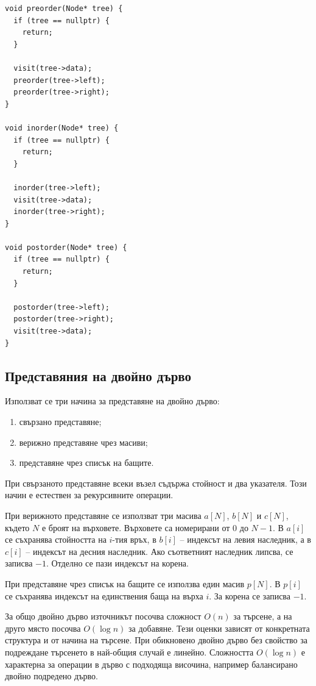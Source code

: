 \begin{verbatim}
void preorder(Node* tree) {
  if (tree == nullptr) {
    return;
  }

  visit(tree->data);
  preorder(tree->left);
  preorder(tree->right);
}

void inorder(Node* tree) {
  if (tree == nullptr) {
    return;
  }

  inorder(tree->left);
  visit(tree->data);
  inorder(tree->right);
}

void postorder(Node* tree) {
  if (tree == nullptr) {
    return;
  }

  postorder(tree->left);
  postorder(tree->right);
  visit(tree->data);
}
\end{verbatim}

\subsection{Представяния на двойно дърво}\label{s:18.6.3}

Използват се три начина за представяне на двойно дърво:

\begin{enumerate}
    \item свързано представяне;
    \item верижно представяне чрез масиви;
    \item представяне чрез списък на бащите.
\end{enumerate}

При свързаното представяне всеки възел съдържа стойност и два указателя. Този начин е естествен за рекурсивните операции.

При верижното представяне се използват три масива $a[N]$, $b[N]$ и $c[N]$, където $N$ е броят на върховете. Върховете са номерирани от $0$ до $N-1$. В $a[i]$ се съхранява стойността на $i$-тия връх, в $b[i]$ -- индексът на левия наследник, а в $c[i]$ -- индексът на десния наследник. Ако съответният наследник липсва, се записва $-1$. Отделно се пази индексът на корена.

При представяне чрез списък на бащите се използва един масив $p[N]$. В $p[i]$ се съхранява индексът на единствения баща на върха $i$. За корена се записва $-1$.

\begin{supp}[Бележка]
За общо двойно дърво източникът посочва сложност $O(n)$ за търсене, а на друго място посочва $O(\log n)$ за добавяне. Тези оценки зависят от конкретната структура и от начина на търсене. При обикновено двойно дърво без свойство за подреждане търсенето в най-общия случай е линейно. Сложността $O(\log n)$ е характерна за операции в дърво с подходяща височина, например балансирано двойно подредено дърво.
\end{supp}


